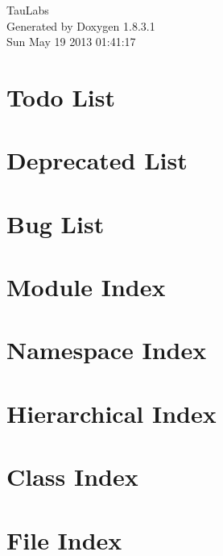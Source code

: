 \documentclass{book}
\begin{document}
\hypersetup{pageanchor=false,citecolor=blue}
\begin{titlepage}
\vspace*{7cm}
\begin{center}
{\Large Tau\-Labs }\\
\vspace*{1cm}
{\large Generated by Doxygen 1.8.3.1}\\
\vspace*{0.5cm}
{\small Sun May 19 2013 01:41:17}\\
\end{center}
\end{titlepage}
\clearemptydoublepage
{}
\tableofcontents
\clearemptydoublepage
{}
\hypersetup{pageanchor=true,citecolor=blue}
\chapter{Todo List}
\label{todo}
\hypertarget{todo}{}

\chapter{Deprecated List}
\label{deprecated}
\hypertarget{deprecated}{}

\chapter{Bug List}
\label{bug}
\hypertarget{bug}{}

\chapter{Module Index}

\chapter{Namespace Index}

\chapter{Hierarchical Index}

\chapter{Class Index}

\chapter{File Index}

\end{document}
